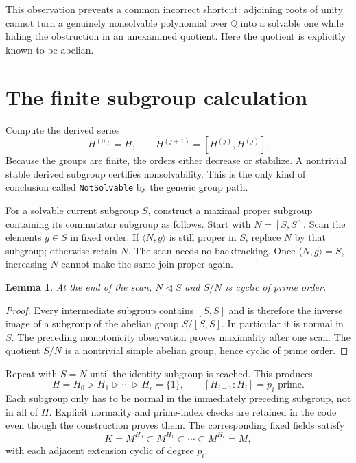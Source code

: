 \documentclass[11pt,a4paper]{article}
\newcommand{\Q}{\mathbb Q}
\newcommand{\code}[1]{\texttt{\small #1}}
\newtheorem{lemma}[theorem]{Lemma}
\theoremstyle{definition}
\begin{document}
This observation prevents a common incorrect shortcut: adjoining roots of
unity cannot turn a genuinely nonsolvable polynomial over $\Q$ into a solvable
one while hiding the obstruction in an unexamined quotient. Here the quotient
is explicitly known to be abelian.

\section{The finite subgroup calculation}
Compute the derived series
\[
 H^{(0)}=H,\qquad H^{(j+1)}=[H^{(j)},H^{(j)}].
\]
Because the groups are finite, the orders either decrease or stabilize. A
nontrivial stable derived subgroup certifies nonsolvability. This is the only
kind of conclusion called \code{NotSolvable} by the generic group path.

For a solvable current subgroup $S$, construct a maximal proper subgroup
containing its commutator subgroup as follows. Start with $N=[S,S]$. Scan the
elements $g\in S$ in fixed order. If $\langle N,g\rangle$ is still proper in
$S$, replace $N$ by that subgroup; otherwise retain $N$. The scan needs no
backtracking. Once $\langle N,g\rangle=S$, increasing $N$ cannot make the same
join proper again.

\begin{lemma}
At the end of the scan, $N\triangleleft S$ and $S/N$ is cyclic of prime order.
\end{lemma}
\begin{proof}
Every intermediate subgroup contains $[S,S]$ and is therefore the inverse
image of a subgroup of the abelian group $S/[S,S]$. In particular it is normal
in $S$. The preceding monotonicity observation proves maximality after one
scan. The quotient $S/N$ is a nontrivial simple abelian group, hence cyclic of
prime order.
\end{proof}

Repeat with $S=N$ until the identity subgroup is reached. This produces
\begin{equation}\label{eq:chain}
 H=H_0\triangleright H_1\triangleright\cdots\triangleright H_r=\{1\},
 \qquad [H_{i-1}:H_i]=p_i\text{ prime}.
\end{equation}
Each subgroup only has to be normal in the immediately preceding subgroup,
not in all of $H$. Explicit normality and prime-index checks are retained in
the code even though the construction proves them. The corresponding fixed
fields satisfy
\[
 K=M^{H_0}\subset M^{H_1}\subset\cdots\subset M^{H_r}=M,
\]
with each adjacent extension cyclic of degree $p_i$.
\end{document}
